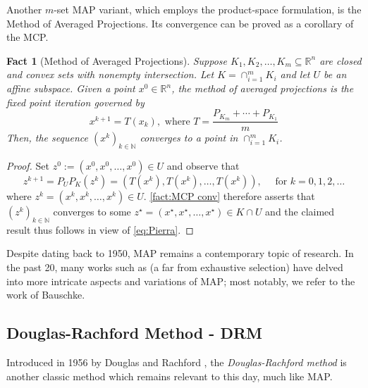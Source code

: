 \documentclass[smallextended,numbook,nospthms]{svjour3}
\theoremstyle{plain}
\newtheorem{fact}[theorem]{Fact}
\theoremstyle{definition}
\def\RR{\mathds R}
\def\NN{\mathds N}
\begin{document}
Another $m$-set MAP variant, which employs the product-space formulation, is the Method of Averaged Projections. Its convergence can be proved as a corollary of the MCP.

\begin{fact}[Method of Averaged Projections]\label{fact:MAvgP}
	Suppose $K_{1}, K_{2}, \ldots, K_{m} \subseteq \RR^n$ are closed and convex sets with nonempty intersection. Let $K = \cap_{i=1}^{m} K_{i}$ and let $U$ be an affine subspace. Given a point $x^{0} \in \RR^n$, the method of averaged projections is the fixed point iteration governed by
	$$
	x^{k+1}=T\left(x_{k}\right), \text { where } T=\frac{P_{K_{m}}+\cdots+P_{K_{1}}}{m}
	$$
	Then, the sequence $\left(x^{k}\right)_{k \in \NN}$ converges to a point in $\cap_{i=1}^{m} K_{i}$.
\end{fact}
\begin{proof}
	Set $z^{0}:=\left(x^{0}, x^{0}, \ldots, x^{0}\right) \in U$ and observe that
	$$
	z^{k+1}=P_{U} P_{K}\left(z^{k}\right)=\left(T\left(x^{k}\right), T\left(x^{k}\right), \ldots, T\left(x^{k}\right)\right), \quad \text { for } k=0,1,2, \ldots
	$$
	where $z^{k}=\left(x^{k}, x^{k}, \ldots, x^{k}\right) \in U$. \cref{fact:MCP conv} therefore asserts that $\left(z^{k}\right)_{k \in \NN}$ converges to some $z^{\star}=\left(x^{\star}, x^{\star}, \ldots, x^{\star}\right) \in K \cap U$ and the claimed result thus follows in view of \cref{eq:Pierra}.	
\end{proof}

Despite dating back to 1950, MAP remains a contemporary topic of research. In the past 20, many works such as \cite{Badea:2012cg,Bauschke:2003,Bauschke:2009, Bauschke:2013, Bauschke:2013jb, Bauschke:2016, Behling:2020a, Bui:2020, Cegielski:2008bd, Diaconis:2010,Drusvyatskiy:2015,Drusvyatskiy:2016ft,Drusvyatskiy:2018,Escalante:2011,HernandezRamos:2011gf,Hesse:2014,Hundal:2004,Kopecka:2004,Kopecka:2010,Kopecka:2011,Kopecka:2012,Kruger:2015wq,Lewis:2009,Tam:2012vp} (a far from exhaustive selection) have delved into more intricate aspects and variations of MAP; most notably, we refer to the work of Bauschke.

\subsection{Douglas-Rachford Method - DRM}\label{subsec:DRM}
Introduced in 1956 by Douglas and Rachford \cite{Douglas:1956kk}, the \emph{Douglas-Rachford method} is another classic method which remains relevant to this day, much like MAP.
\end{document}

